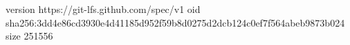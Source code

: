 version https://git-lfs.github.com/spec/v1
oid sha256:3dd4e86cd3930e4d41185d952f59b8d0275d2dcb124c0ef7f564abeb9873b024
size 251556
